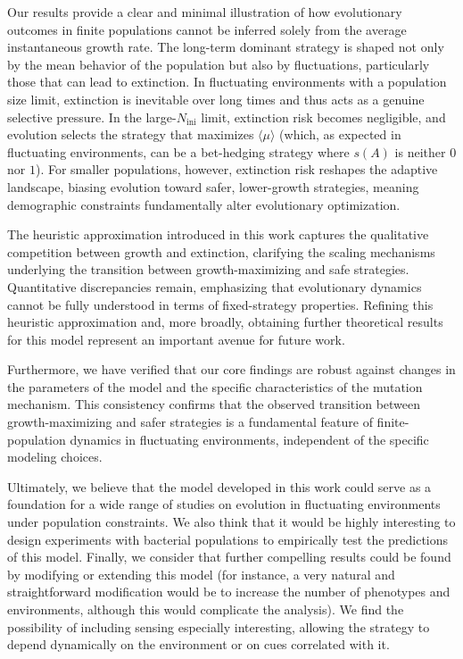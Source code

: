 \documentclass[aps,pre,reprint,10pt,superscriptaddress]{revtex4-2}
\begin{document}
Our results provide a clear and minimal illustration of how evolutionary outcomes in finite populations cannot be inferred solely from the average instantaneous growth rate. The long-term dominant strategy is shaped not only by the mean behavior of the population but also by fluctuations, particularly those that can lead to extinction. In fluctuating environments with a population size limit, extinction is inevitable over long times and thus acts as a genuine selective pressure. In the large-$N_\text{ini}$ limit, extinction risk becomes negligible, and evolution selects the strategy that maximizes $\langle\mu\rangle$ (which, as expected in fluctuating environments, can be a bet-hedging strategy where $s(A)$ is neither $0$ nor $1$). For smaller populations, however, extinction risk reshapes the adaptive landscape, biasing evolution toward safer, lower-growth strategies, meaning demographic constraints fundamentally alter evolutionary optimization.

The heuristic approximation introduced in this work captures the qualitative competition between growth and extinction, clarifying the scaling mechanisms underlying the transition between growth-maximizing and safe strategies. Quantitative discrepancies remain, emphasizing that evolutionary dynamics cannot be fully understood in terms of fixed-strategy properties. Refining this heuristic approximation and, more broadly, obtaining further theoretical results for this model represent an important avenue for future work.

Furthermore, we have verified that our core findings are robust against changes in the parameters of the model and the specific characteristics of the mutation mechanism. This consistency confirms that the observed transition between growth-maximizing and safer strategies is a fundamental feature of finite-population dynamics in fluctuating environments, independent of the specific modeling choices.

Ultimately, we believe that the model developed in this work could serve as a foundation for a wide range of studies on evolution in fluctuating environments under population constraints. We also think that it would be highly interesting to design experiments with bacterial populations to empirically test the predictions of this model. Finally, we consider that further compelling results could be found by modifying or extending this model (for instance, a very natural and straightforward modification would be to increase the number of phenotypes and environments, although this would complicate the analysis). We find the possibility of including sensing especially interesting, allowing the strategy to depend dynamically on the environment or on cues correlated with it.
\end{document}
